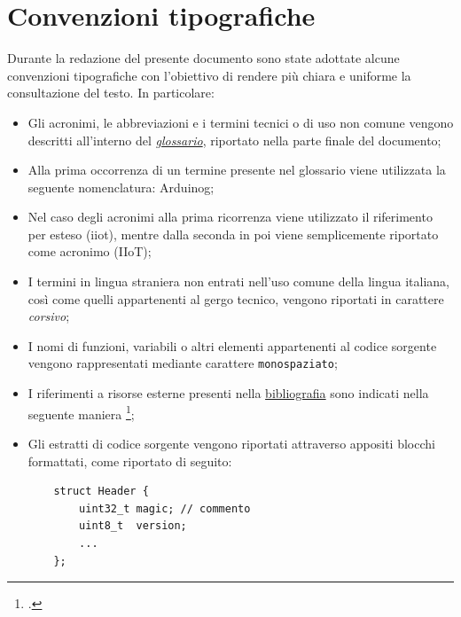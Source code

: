 \section{Convenzioni tipografiche}

Durante la redazione del presente documento sono state adottate alcune convenzioni
tipografiche con l'obiettivo di rendere più chiara e uniforme la consultazione del testo.
In particolare:

\begin{itemize}

    \item Gli acronimi, le abbreviazioni e i termini tecnici o di uso non comune vengono
    descritti all'interno del \textit{\hyperref[chap:glossario]{glossario}}, riportato nella parte finale del documento;

    \item Alla prima occorrenza di un termine presente nel glossario viene utilizzata la
    seguente nomenclatura: \gls{Arduinog};

    \item Nel caso degli acronimi alla prima ricorrenza viene utilizzato il riferimento per esteso (\gls{iiot}),
    mentre dalla seconda in poi viene semplicemente riportato come acronimo (IIoT);

    \item I termini in lingua straniera non entrati nell'uso comune della lingua italiana,
    così come quelli appartenenti al gergo tecnico, vengono riportati in carattere
    \textit{corsivo};

    \item I nomi di funzioni, variabili o altri elementi appartenenti al codice sorgente
    vengono rappresentati mediante carattere \texttt{monospaziato};

    \item I riferimenti a risorse esterne presenti nella \hyperref[cap:webliography]{bibliografia} 
    sono indicati nella seguente maniera \footcite{site:esp32-s3-devkitc1};

    \item Gli estratti di codice sorgente vengono riportati attraverso appositi blocchi
    formattati, come riportato di seguito:
    \begin{listing}[H]
    \begin{verbatim}
    struct Header {
        uint32_t magic; // commento
        uint8_t  version;
        ...
    };
    \end{verbatim}
    \caption{Esempio di estratto di codice}
    \end{listing}


\end{itemize}

